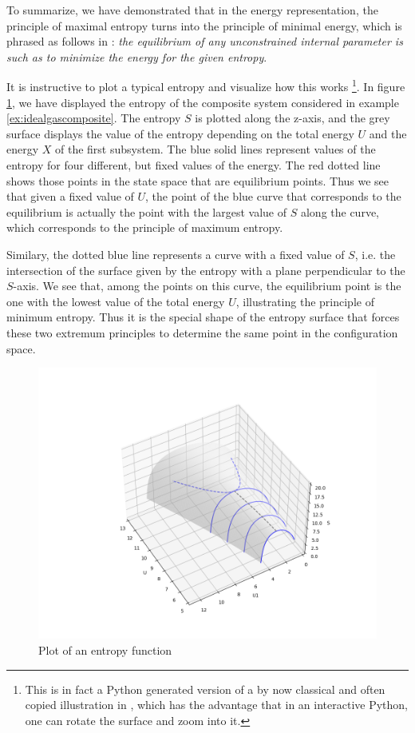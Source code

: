 \documentclass[a4paper, draft]{article}
\theoremstyle{own}
\theoremstyle{remark}
\begin{document}
To summarize, we have demonstrated that in the energy representation, the principle of maximal entropy turns into the principle of minimal energy, which is phrased as follows in \cite{Callen}: {\em the equilibrium of any unconstrained internal parameter is such as to minimize the energy for the given entropy}. 

It is instructive to plot a typical entropy and visualize how this works
\footnote{
This is in fact a Python generated version of a by now classical and often copied illustration in \cite{Callen}, which has the advantage that in an interactive Python, one can rotate the surface and zoom into it.
}. In figure \ref{fig:EntropyPlot}, we have displayed the entropy of the composite system considered in example \ref{ex:idealgascomposite}. The entropy $S$ is plotted along the z-axis, and the grey surface displays the value of the entropy depending on the total energy $U$ and the energy $X$ of the first subsystem. The blue solid lines represent values of the entropy for four different, but fixed values of the energy. The red dotted line shows those points in the state space that are equilibrium points. Thus we see that given a fixed value of $U$, the point of the blue curve that corresponds to the equilibrium is actually the point with the largest value of $S$ along the curve, which corresponds to the principle of maximum entropy.

Similary, the dotted blue line represents a curve with a fixed value of $S$, i.e. the intersection of the surface given by the entropy with a plane perpendicular to the $S$-axis. We see that, among the points on this curve, the equilibrium point is the one with the lowest value of the total energy $U$, illustrating the principle of minimum entropy. Thus it is the special shape of the entropy surface that forces these two extremum principles to determine the same point in the configuration space.


\begin{figure}[ht]
\includegraphics[scale=0.5]{EntropyPlot}
\caption{Plot of an entropy function}
\label{fig:EntropyPlot}
\end{figure}
\end{document}
